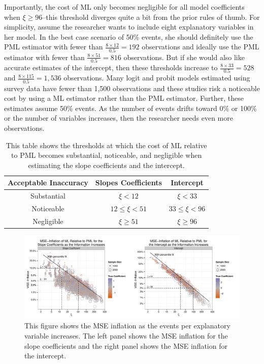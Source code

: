 \documentclass[12pt]{article}
\begin{document}
Importantly, the cost of ML only becomes negligible for all model coefficients when $\xi \geq 96$--this threshold diverges quite a bit from the prior rules of thumb.
For simplicity, assume the researcher wants to include eight explanatory variables in her model.
In the best case scenario of 50\% events, she should definitely use the PML estimator with fewer than $\frac{8 \times 12}{0.5} = 192$ observations and ideally use the PML estimator with fewer than $\frac{8 \times 51}{0.5} = 816$ observations.  
But if she would also like accurate estimates of the intercept, then these thresholds increase to $\frac{8 \times 33}{0.5} = 528$ and $\frac{8 \times 115}{0.5} = 1,536$ observations. 
Many logit and probit models estimated using survey data have fewer than 1,500 observations and these studies risk a noticeable cost by using a ML estimator rather than the PML estimator.
Further, these estimates assume 50\% events. 
As the number of events drifts toward 0\% or 100\% or the number of variables increases, then the researcher needs even more observations.

\begin{table}[h]
\centering
\begin{tabular}{ccc}
\hline
Acceptable Inaccuracy   &  Slopes Coefficients     & Intercept        \\ \hline
Substantial & $\xi < 12$         & $\xi < 33$          \\
Noticeable  & $12 \leq \xi < 51$ & $33 \leq \xi < 96$ \\
Negligible  & $\xi \geq 51$        & $\xi \geq 96$        
\end{tabular}
\caption{This table shows the thresholds at which the cost of ML relative to PML becomes substantial, noticeable, and negligible when estimating the slope coefficients and the intercept.}\label{tbl:thresholds}
\end{table}

\begin{figure}[h]
\begin{center}
\includegraphics[width = \textwidth]{figs/mse-infl-larger-samples.pdf}
\caption{This figure shows the MSE inflation as the events per explanatory variable increases. The left panel shows the MSE inflation for the slope coefficients and the right panel shows the MSE inflation for the intercept.}\label{fig:ge-qis}
\end{center}
\end{figure}
\end{document}
